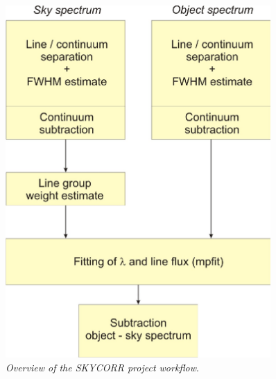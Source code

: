 \begin{figure}[ht]
  \begin{center}
    \includegraphics[width=0.9\textwidth]{figures/skycorr_workflow_scheme.png}
    \caption{{\it Overview of the SKYCORR project workflow}.}
    \label{fig:skycorr_overview}
  \end{center}
\end{figure}
